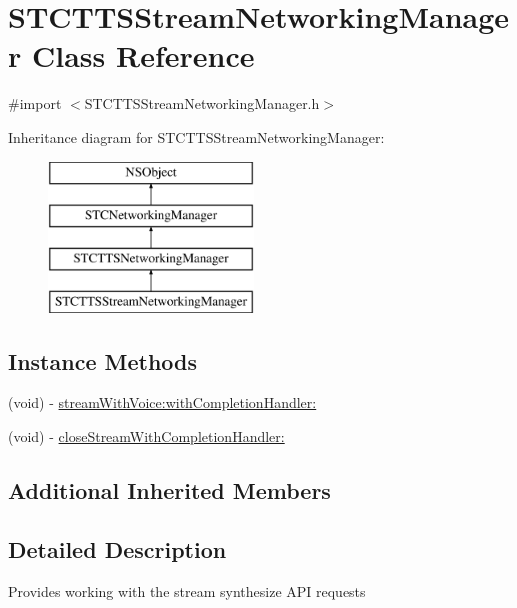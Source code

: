\hypertarget{interface_s_t_c_t_t_s_stream_networking_manager}{}\section{S\+T\+C\+T\+T\+S\+Stream\+Networking\+Manager Class Reference}
\label{interface_s_t_c_t_t_s_stream_networking_manager}


{\ttfamily \#import $<$S\+T\+C\+T\+T\+S\+Stream\+Networking\+Manager.\+h$>$}

Inheritance diagram for S\+T\+C\+T\+T\+S\+Stream\+Networking\+Manager\+:\begin{figure}[H]
\begin{center}
\leavevmode
\includegraphics[height=4.000000cm]{interface_s_t_c_t_t_s_stream_networking_manager}
\end{center}
\end{figure}
\subsection*{Instance Methods}
\begin{DoxyCompactItemize}
\item 
(void) -\/ \hyperlink{interface_s_t_c_t_t_s_stream_networking_manager_a39c01a6d865cccc493eac9642ff7d3d4}{stream\+With\+Voice\+:with\+Completion\+Handler\+:}
\item 
(void) -\/ \hyperlink{interface_s_t_c_t_t_s_stream_networking_manager_a2291cf3c0fa6035f4cc848712685a0b4}{close\+Stream\+With\+Completion\+Handler\+:}
\end{DoxyCompactItemize}
\subsection*{Additional Inherited Members}


\subsection{Detailed Description}
Provides working with the stream synthesize A\+PI requests 

